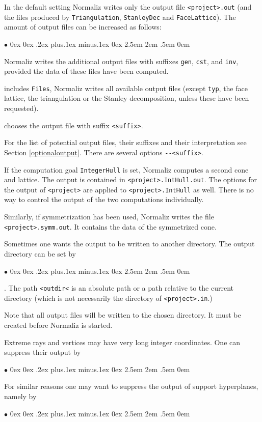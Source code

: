 \documentclass[12pt,a4paper]{scrartcl}
\newcommand{\stdli}{ \topsep0ex \partopsep0ex %
\parsep.2ex plus.1ex minus.1ex \itemsep0ex%
\leftmargin2.5em \labelwidth2em \labelsep.5em \rightmargin0em}%
\renewenvironment{itemize}{\begin{list}{{$\bullet$}}{\stdli}}{\end{list}}
\theoremstyle{definition}
\def\itemtt[#1]{\item[\textbf{\ttt{#1}}]}
\def\ttt{\texttt}
\begin{document}
In the default setting Normaliz writes only the output file
\ttt{<project>.out} (and the files produced by \ttt{Triangulation}, \ttt{StanleyDec} and \ttt{FaceLattice}). The
amount of output files can be
increased as follows:
\begin{itemize}
	\itemtt[{-}{-}files, -f] Normaliz writes the additional output files
	with suffixes \ttt{gen}, \ttt{cst}, and \ttt{inv},
	provided the data of these files have been computed.
	\itemtt[{-}{-}all-files, -a] includes \ttt{Files}, Normaliz writes all
	available output files (except \verb|typ|, the face lattice, the triangulation or the
	Stanley decomposition, unless these have been requested).
	\itemtt [{-}{-}<suffix>] chooses the output file with suffix \verb|<suffix>|.
\end{itemize}

For the list of potential output files, their suffixes and their interpretation
see Section \ref{optionaloutput}. There are several options \verb|--<suffix>|.

If the computation goal \verb|IntegerHull| is set, Normaliz computes a second cone and lattice. The output is contained in \verb|<project>.IntHull.out|. The options for the output of \verb|<project>| are applied to \verb|<project>.IntHull| as well. There is no way to control the output of the two computations individually.

Similarly, if symmetrization has been used, Normaliz writes the file \verb|<project>.symm.out|. It contains the data of the symmetrized cone.

Sometimes one wants the output to be written to another directory. The output directory can be set by
\begin{itemize}
	\itemtt[{-}{-OutputDir=<outdir>}]. The path \ttt{<outdir<} is an absolute path or a path relative to the current directory (which is not necessarily the directory of \verb|<project>.in|.)	
\end{itemize}
Note that all output files will be written to the chosen directory. It must be created before Normaliz is started.

Extreme rays and vertices may have very long integer coordinates. One can suppress their output by
\begin{itemize}
	\itemtt[NoExtRaysOutput] 
\end{itemize}
For similar reasons one may want to suppress the output of support hyperplanes, namely by
\begin{itemize}
	\itemtt[NoSuppHypsOutput] 
\end{itemize}
\end{document}
